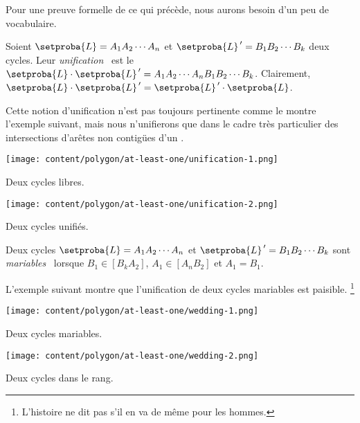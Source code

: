 

Pour une preuve formelle de ce qui précède, nous aurons besoin d'un peu de vocabulaire.


\begin{defi}
    Soient
    $\setproba{L} = A_1 A_2 \cdots A_n$ 
    et
    $\setproba{L}^{\,\prime} = B_1 B_2 \cdots B_k$ 
    deux cycles.
    Leur \og \emph{unification} \fg\ est le  $\setproba{L} \cdot \setproba{L}^{\,\prime} = A_1 A_2 \cdots A_n B_1 B_2 \cdots B_k$.
    Clairement, $\setproba{L} \cdot \setproba{L}^{\,\prime} = \setproba{L}^{\,\prime} \cdot \setproba{L}$.
\end{defi}


Cette notion d'unification n'est pas toujours pertinente comme le montre l'exemple suivant, mais nous n'unifierons que dans le cadre très particulier des intersections d'arêtes non contigües d'un \ncycle.


\begin{multicols}{2}
    \small\itshape
    \begin{center}
        \texttt{[image: content/polygon/at-least-one/unification-1.png]}

        \smallskip
        Deux cycles libres.
    \end{center}


    \begin{center}
        \texttt{[image: content/polygon/at-least-one/unification-2.png]}

        \smallskip
        Deux cycles unifiés.
    \end{center}
\end{multicols}




\begin{defi}
    Deux cycles
    $\setproba{L} = A_1 A_2 \cdots A_n$ 
    et
    $\setproba{L}^{\,\prime} = B_1 B_2 \cdots B_k$ 
    sont \og \emph{mariables} \fg\ lorsque
    $B_1 \in [B_k A_2]$,
    $A_1 \in [A_n B_2]$
    et
    $A_1 = B_1$.
\end{defi}


L'exemple suivant montre que l'unification de deux cycles mariables est paisible.%
\footnote{
	L'histoire ne dit pas s'il en va de même pour les hommes.
}

\begin{multicols}{2}
    \small\itshape
    \begin{center}
        \texttt{[image: content/polygon/at-least-one/wedding-1.png]}

        \smallskip
        Deux cycles mariables.
    \end{center}


    \begin{center}
        \texttt{[image: content/polygon/at-least-one/wedding-2.png]}

        \smallskip
        Deux cycles dans le rang.
    \end{center}
\end{multicols}
    

